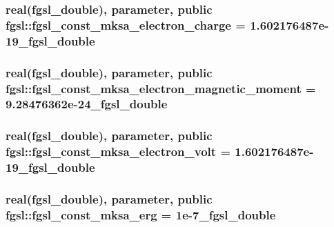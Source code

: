 \hypertarget{classfgsl_a5e5f274ebbe5764c7828f792b8b10b12}{
\subsubsection[{fgsl\-\_\-const\-\_\-mksa\-\_\-electron\-\_\-charge}]{\setlength{\rightskip}{0pt plus 5cm}real({\bf fgsl\-\_\-double}), parameter, public fgsl\-::fgsl\-\_\-const\-\_\-mksa\-\_\-electron\-\_\-charge = 1.\-602176487e-\/19\-\_\-fgsl\-\_\-double}}\label{classfgsl_a5e5f274ebbe5764c7828f792b8b10b12}
\hypertarget{classfgsl_ae360dd0b55b309065855f8521a316e0f}{
\subsubsection[{fgsl\-\_\-const\-\_\-mksa\-\_\-electron\-\_\-magnetic\-\_\-moment}]{\setlength{\rightskip}{0pt plus 5cm}real({\bf fgsl\-\_\-double}), parameter, public fgsl\-::fgsl\-\_\-const\-\_\-mksa\-\_\-electron\-\_\-magnetic\-\_\-moment = 9.\-28476362e-\/24\-\_\-fgsl\-\_\-double}}\label{classfgsl_ae360dd0b55b309065855f8521a316e0f}
\hypertarget{classfgsl_a2b715db04903e667b5f50d6df3054bee}{
\subsubsection[{fgsl\-\_\-const\-\_\-mksa\-\_\-electron\-\_\-volt}]{\setlength{\rightskip}{0pt plus 5cm}real({\bf fgsl\-\_\-double}), parameter, public fgsl\-::fgsl\-\_\-const\-\_\-mksa\-\_\-electron\-\_\-volt = 1.\-602176487e-\/19\-\_\-fgsl\-\_\-double}}\label{classfgsl_a2b715db04903e667b5f50d6df3054bee}
\hypertarget{classfgsl_a7135370afba011fa6c30a3028af76f15}{
\subsubsection[{fgsl\-\_\-const\-\_\-mksa\-\_\-erg}]{\setlength{\rightskip}{0pt plus 5cm}real({\bf fgsl\-\_\-double}), parameter, public fgsl\-::fgsl\-\_\-const\-\_\-mksa\-\_\-erg = 1e-\/7\-\_\-fgsl\-\_\-double}}\label{classfgsl_a7135370afba011fa6c30a3028af76f15}
